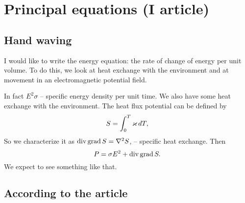 







\section{Principal equations (I article)}


\subsection{Hand waving}

I would like to write the energy equation: the rate of change of energy per unit volume. To do this, we look at heat exchange with the environment and at movement in an electromagnetic potential field.

In fact $E^2\sigma$ -- specific energy density per unit time. We also have some heat exchange with the environment.
The heat flux potential can be defined by
\begin{equation}
    S = \int_0^T \varkappa \, d T,
\end{equation}
So we characterize it as $\mathop{\mathrm{div}}\nolimits \mathop{\mathrm{grad}}\nolimits S = \nabla^2 S$, --  specific heat exchange. Then
\begin{equation*}
    P = \sigma E^2 + \mathop{\mathrm{div}}\nolimits \mathop{\mathrm{grad}}\nolimits S.
\end{equation*}
We expect to see something like that.

\subsection{According to the article}



